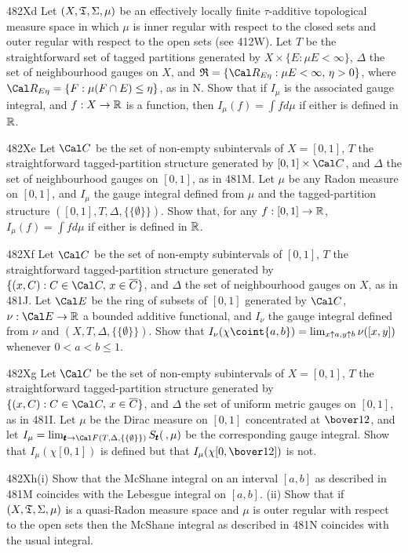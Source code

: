 {\sqheader 482Xd Let $(X,\frak T,\Sigma,\mu)$ be an effectively locally
finite $\tau$-additive topological measure space in which $\mu$ is
inner
regular with respect to the closed sets and outer regular with respect
to the open sets (see 412W).   Let $T$ be the straightforward set of
tagged partitions generated by $X\times\{E:\mu E<\infty\}$, $\Delta$
the set of neighbourhood gauges on $X$, and
$\frak R=\{\Cal R_{E\eta}:\mu E<\infty,\,\eta>0\}$, where
$\Cal R_{E\eta}=\{F:\mu(F\cap E)\le\eta\}$, as in N.   Show that if
$I_{\mu}$ is the associated gauge integral, and $f:X\to\Bbb R$ is a
function, then $I_{\mu}(f)=\int fd\mu$ if either is defined in $\Bbb R$.

\spheader 482Xe Let $\Cal C$ be the set of non-empty subintervals of
$X=[0,1]$, $T$ the straightforward tagged-partition structure
generated
by $[0,1]\times\Cal C$, and $\Delta$ the set of neighbourhood gauges
on $[0,1]$, as in 481M.   Let $\mu$ be any Radon measure on $[0,1]$, and
$I_{\mu}$ the gauge integral defined from $\mu$ and the
tagged-partition
structure $([0,1],T,\Delta,\{\{\emptyset\}\})$.   Show that, for any
$f:[0,1]\to\Bbb R$, $I_{\mu}(f)=\int fd\mu$ if either is defined in
$\Bbb R$.

\spheader 482Xf Let $\Cal C$ be the set of non-empty subintervals of
$[0,1]$, $T$ the straightforward tagged-partition structure generated
by $\{(x,C):C\in\Cal C,\,x\in\overline{C}\}$, and $\Delta$ the set of
neighbourhood gauges on $X$, as in 481J.   Let $\Cal E$ be the ring
of subsets of $[0,1]$ generated by $\Cal C$,
$\nu:\Cal E\to\Bbb R$ a bounded additive functional, and
$I_{\nu}$ the gauge integral defined from $\nu$ and
$(X,T,\Delta,\{\{\emptyset\}\})$.   Show that
$I_{\nu}(\chi\coint{a,b})=\lim_{x\uparrow a,y\uparrow b}\nu([x,y])$
whenever $0<a<b\le 1$.

\spheader 482Xg Let $\Cal C$ be the set of non-empty subintervals of
$X=[0,1]$, $T$ the straightforward tagged-partition structure
generated
by $\{(x,C):C\in\Cal C,\,x\in\overline{C}\}$, and $\Delta$ the set of
uniform metric gauges on $[0,1]$, as in 481I.   Let $\mu$ be the Dirac
measure on $[0,1]$ concentrated at $\bover12$, and let
$I_{\mu}
=\lim_{\pmb{t}\to\Cal F(T,\Delta,\{\{\emptyset\}\})}S_{\pmb{t}}(\,,\mu)$
be the corresponding gauge integral.   Show that $I_{\mu}(\chi[0,1])$
is
defined but that $I_{\mu}(\chi[0,\bover12])$ is not.

\sqheader 482Xh(i) Show that the McShane integral on an interval
$[a,b]$ as described in 481M coincides with the Lebesgue integral on
$[a,b]$.   (ii) Show that if $(X,\frak T,\Sigma,\mu)$ is a quasi-Radon
measure space and $\mu$ is outer regular with respect to the open sets
then the McShane integral as described in 481N coincides with the
usual integral.

}
